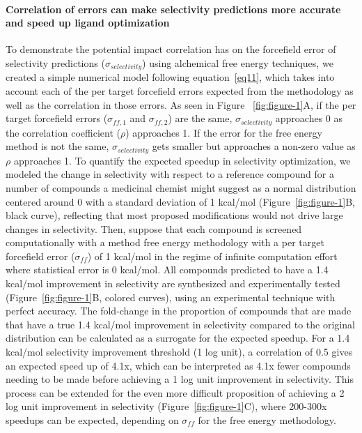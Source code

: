 \documentclass[9pt,lineno]{elife-modified} %
\begin{document}
\paragraph{Correlation of errors can make selectivity predictions more accurate and speed up ligand optimization}

To demonstrate the potential impact correlation has on the forcefield error of selectivity predictions ($\sigma_{selectivity}$) using alchemical free energy techniques, we created a simple numerical model following equation~\ref{eq11}, which takes into account each of the per target forcefield errors expected from the methodology as well as the correlation in those errors. As seen in Figure ~\ref{fig:figure-1}A, if the per target forcefield errors ($\sigma_{ff,1}$ and $\sigma_{ff,2}$) are the same, $\sigma_{selectivity}$ approaches 0 as the correlation coefficient ($\rho$) approaches 1. If the error for the free energy method is not the same, $\sigma_{selectivity}$ gets smaller but approaches a non-zero value as $\rho$ approaches 1. 
To quantify the expected speedup in selectivity optimization, we modeled the change in selectivity with respect to a reference compound for a number of compounds a medicinal chemist might suggest as a normal distribution centered around 0 with a standard deviation of 1 kcal/mol (Figure~\ref{fig:figure-1}B, black curve), reflecting that most proposed modifications would not drive large changes in selectivity. Then, suppose that each compound is screened computationally with a method free energy methodology with a per target forcefield error ($\sigma_{ff}$) of 1 kcal/mol in the regime of infinite computation effort where statistical error is 0 kcal/mol. All compounds predicted to have a 1.4 kcal/mol improvement in selectivity are synthesized and experimentally tested (Figure~\ref{fig:figure-1}B, colored curves), using an experimental technique with perfect accuracy. The fold-change in the proportion of compounds that are made that have a true 1.4 kcal/mol improvement in selectivity compared to the original distribution can be calculated as a surrogate for the expected speedup. For a 1.4 kcal/mol selectivity improvement threshold (1 log unit), a correlation of 0.5 gives an expected speed up of 4.1x, which can be interpreted as 4.1x fewer compounds needing to be made before achieving a 1 log unit improvement in selectivity. This process can be extended for the even more difficult proposition of achieving a 2 log unit improvement in selectivity (Figure~\ref{fig:figure-1}C), where 200-300x speedups can be expected, depending on $\sigma_{ff}$ for the free energy methodology. 
\end{document}
